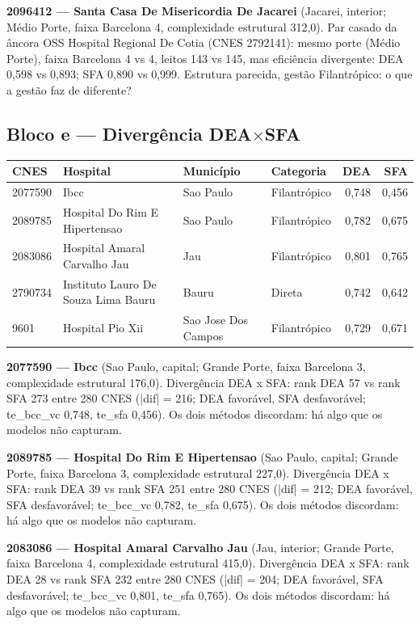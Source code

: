 \documentclass[12pt,a4paper]{article}
\begin{document}
\noindent\textbf{2096412 --- Santa Casa De Misericordia De Jacarei} (Jacarei, interior; Médio Porte, faixa Barcelona 4, complexidade estrutural 312,0). Par casado da âncora OSS Hospital Regional De Cotia (CNES 2792141): mesmo porte (Médio Porte), faixa Barcelona 4 vs 4, leitos 143 vs 145, mas eficiência divergente: DEA 0,598 vs 0,893; SFA 0,890 vs 0,999. Estrutura parecida, gestão Filantrópico: o que a gestão faz de diferente?\par\medskip

\subsection{Bloco e --- Divergência DEA$\times$SFA}
\begin{center}\small
\begin{tabular}{llllrr}
\toprule
CNES & Hospital & Município & Categoria & DEA & SFA \\
\midrule
2077590 & Ibcc & Sao Paulo & Filantrópico & 0,748 & 0,456 \\
2089785 & Hospital Do Rim E Hipertensao & Sao Paulo & Filantrópico & 0,782 & 0,675 \\
2083086 & Hospital Amaral Carvalho Jau & Jau & Filantrópico & 0,801 & 0,765 \\
2790734 & Instituto Lauro De Souza Lima Bauru & Bauru & Direta & 0,742 & 0,642 \\
9601 & Hospital Pio Xii & Sao Jose Dos Campos & Filantrópico & 0,729 & 0,671 \\
\bottomrule
\end{tabular}
\end{center}
\noindent\textbf{2077590 --- Ibcc} (Sao Paulo, capital; Grande Porte, faixa Barcelona 3, complexidade estrutural 176,0). Divergência DEA x SFA: rank DEA 57 vs rank SFA 273 entre 280 CNES (|dif| = 216; DEA favorável, SFA desfavorável; te\_bcc\_vc 0,748, te\_sfa 0,456). Os dois métodos discordam: há algo que os modelos não capturam.\par\medskip
\noindent\textbf{2089785 --- Hospital Do Rim E Hipertensao} (Sao Paulo, capital; Grande Porte, faixa Barcelona 3, complexidade estrutural 227,0). Divergência DEA x SFA: rank DEA 39 vs rank SFA 251 entre 280 CNES (|dif| = 212; DEA favorável, SFA desfavorável; te\_bcc\_vc 0,782, te\_sfa 0,675). Os dois métodos discordam: há algo que os modelos não capturam.\par\medskip
\noindent\textbf{2083086 --- Hospital Amaral Carvalho Jau} (Jau, interior; Grande Porte, faixa Barcelona 4, complexidade estrutural 415,0). Divergência DEA x SFA: rank DEA 28 vs rank SFA 232 entre 280 CNES (|dif| = 204; DEA favorável, SFA desfavorável; te\_bcc\_vc 0,801, te\_sfa 0,765). Os dois métodos discordam: há algo que os modelos não capturam.\par\medskip
\end{document}
